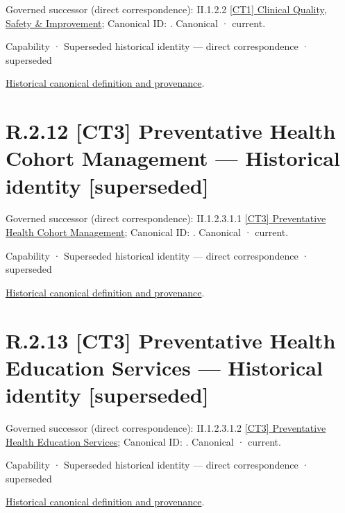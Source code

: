 {\small Governed successor (direct correspondence): II.1.2.2 \hyperref[element:63837bf848774572a06b935af95581a2]{[CT1] Clinical Quality, Safety \& Improvement}; Canonical ID: \texttt{}. Canonical · current.}\par
\label{element:b967c383dbcd4c24abe6a83ea5e79e00}
{\small Capability · Superseded historical identity — direct correspondence · superseded}\par
\href{../../../../../../../continuum/strategy/capability/b967c383dbcd4c24abe6a83ea5e79e00.md}{Historical canonical definition and provenance}.\par
\section*{R.2.12 [CT3] Preventative Health Cohort Management — Historical identity [superseded]}
\label{navigation:R.2.12}

{\small Governed successor (direct correspondence): II.1.2.3.1.1 \hyperref[element:97625bb28e5745d5994e1bffd4037188]{[CT3] Preventative Health Cohort Management}; Canonical ID: \texttt{}. Canonical · current.}\par
\label{element:fef479f0fd5048b19b2aec770f0233fe}
{\small Capability · Superseded historical identity — direct correspondence · superseded}\par
\href{../../../../../../../continuum/strategy/capability/fef479f0fd5048b19b2aec770f0233fe.md}{Historical canonical definition and provenance}.\par
\section*{R.2.13 [CT3] Preventative Health Education Services — Historical identity [superseded]}
\label{navigation:R.2.13}

{\small Governed successor (direct correspondence): II.1.2.3.1.2 \hyperref[element:7541d9b3b65d47d286dabdc093cb0eed]{[CT3] Preventative Health Education Services}; Canonical ID: \texttt{}. Canonical · current.}\par
\label{element:dbe10959237f405caeadef2a5748303a}
{\small Capability · Superseded historical identity — direct correspondence · superseded}\par
\href{../../../../../../../continuum/strategy/capability/dbe10959237f405caeadef2a5748303a.md}{Historical canonical definition and provenance}.\par

